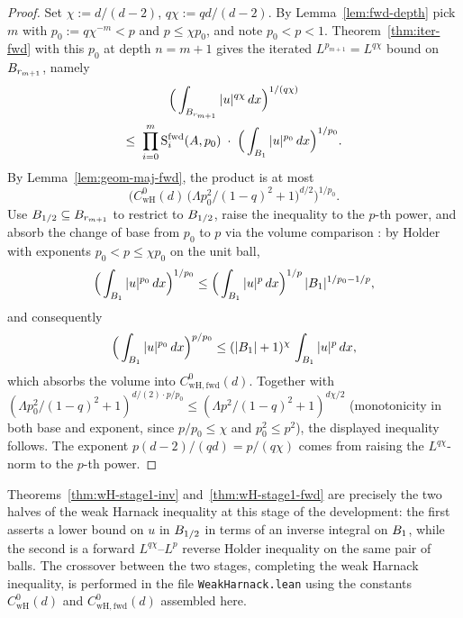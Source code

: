 \begin{proof}
\leanok
{}

Set $\chi := d/(d-2)$, $q\chi := q d/(d-2)$. By Lemma~\ref{lem:fwd-depth} pick
$m$ with $p_0 := q\chi^{-m} < p$ and $p \leq \chi p_0$, and note $p_0 < p < 1$.
Theorem~\ref{thm:iter-fwd} with this $p_0$ at depth $n = m+1$ gives the iterated
$L^{p_{m+1}} = L^{q\chi}$ bound on $B_{r_{m+1}}$, namely
\begin{multline*}
  \Big(\int_{B_{r_{m+1}}} |u|^{q\chi}\,dx\Big)^{1/(q\chi)}
  \\ \leq\;
  \prod_{i=0}^{m}\mathrm{S}_i^{\mathrm{fwd}}(A,p_0)\;\cdot\;
  \Big(\int_{B_{1}} |u|^{p_0}\,dx\Big)^{1/p_0}.
\end{multline*}
By Lemma~\ref{lem:geom-maj-fwd}, the product is at most
\begin{equation*}
  \Big(C_{\mathrm{wH}}^{0}(d)\,
    \big(\Lambda p_0^{2}/(1-q)^{2}+1\big)^{d/2}\Big)^{1/p_0}.
\end{equation*}
Use $B_{1/2} \subseteq B_{r_{m+1}}$ to restrict to $B_{1/2}$, raise the
inequality to the $p$-th power, and absorb the change of base from $p_0$ to $p$
via the volume comparison
: by Holder with
exponents $p_0 < p \leq \chi p_0$ on the unit ball,
\begin{equation*}
  \Big(\int_{B_{1}} |u|^{p_0}\,dx\Big)^{1/p_0}
  \leq
  \Big(\int_{B_{1}} |u|^{p}\,dx\Big)^{1/p}\,
  |B_{1}|^{1/p_0 - 1/p},
\end{equation*}
and consequently
\begin{equation*}
  \Big(\int_{B_{1}} |u|^{p_0}\,dx\Big)^{p/p_0}
  \leq (|B_{1}|+1)^{\chi}\,\int_{B_{1}} |u|^{p}\,dx,
\end{equation*}
which absorbs the volume into $C_{\mathrm{wH,fwd}}^{0}(d)$. Together with
$(\Lambda p_0^{2}/(1-q)^{2}+1)^{d/(2)\cdot p/p_0} \leq
(\Lambda p^{2}/(1-q)^{2}+1)^{d\chi/2}$
(monotonicity in both base and exponent, since $p/p_0 \leq \chi$ and
$p_0^{2} \leq p^{2}$), the displayed inequality follows. The exponent
$p(d-2)/(qd) = p/(q\chi)$ comes from raising the $L^{q\chi}$-norm to the
$p$-th power.
\end{proof}

\begin{remark}
Theorems~\ref{thm:wH-stage1-inv} and~\ref{thm:wH-stage1-fwd} are precisely the
two halves of the weak Harnack inequality at this stage of the development:
the first asserts a lower bound on $u$ in $B_{1/2}$ in terms of an inverse
integral on $B_{1}$, while the second is a forward $L^{q\chi}$--$L^{p}$
reverse Holder inequality on the same pair of balls. The crossover between
the two stages, completing the weak Harnack inequality, is performed in the
file \texttt{WeakHarnack.lean} using the constants $C_{\mathrm{wH}}^{0}(d)$
and $C_{\mathrm{wH,fwd}}^{0}(d)$ assembled here.
\end{remark}



